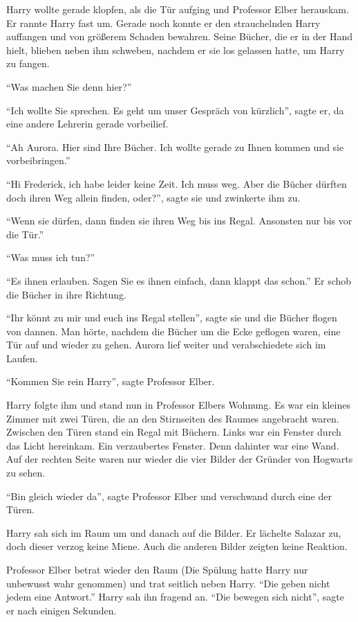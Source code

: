 Harry wollte gerade klopfen, als die Tür aufging und Professor Elber herauskam. Er rannte Harry fast um. Gerade noch konnte er den strauchelnden Harry auffangen und von größerem Schaden bewahren. Seine Bücher, die er in der Hand hielt, blieben neben ihm schweben, nachdem er sie los gelassen hatte, um Harry zu fangen.

\enquote{Was machen Sie denn hier?}

\enquote{Ich wollte Sie sprechen. Es geht um unser Gespräch von kürzlich}, sagte er, da eine andere Lehrerin gerade vorbeilief.

\enquote{Ah Aurora. Hier sind Ihre Bücher. Ich wollte gerade zu Ihnen kommen und sie vorbeibringen.}

\enquote{Hi Frederick, ich habe leider keine Zeit. Ich muss weg. Aber die Bücher dürften doch ihren Weg allein finden, oder?}, sagte sie und zwinkerte ihm zu.

\enquote{Wenn sie dürfen, dann finden sie ihren Weg bis ins Regal. Ansonsten nur bis vor die Tür.}

\enquote{Was muss ich tun?}

\enquote{Es ihnen erlauben. Sagen Sie es ihnen einfach, dann klappt das schon.} Er schob die Bücher in ihre Richtung.

\enquote{Ihr könnt zu mir und euch ins Regal stellen}, sagte sie und die Bücher flogen von dannen. Man hörte, nachdem die Bücher um die Ecke geflogen waren, eine Tür auf und wieder zu gehen. Aurora lief weiter und verabschiedete sich im Laufen.

\enquote{Kommen Sie rein Harry}, sagte Professor Elber.

Harry folgte ihm und stand nun in Professor Elbers Wohnung. Es war ein kleines Zimmer mit zwei Türen, die an den Stirnseiten des Raumes angebracht waren. Zwischen den Türen stand ein Regal mit Büchern. Links war ein Fenster durch das Licht hereinkam. Ein verzaubertes Fenster. Denn dahinter war eine Wand. Auf der rechten Seite waren nur wieder die vier Bilder der Gründer von Hogwarts zu sehen.

\enquote{Bin gleich wieder da}, sagte Professor Elber und verschwand durch eine der Türen.

Harry sah sich im Raum um und danach auf die Bilder. Er lächelte Salazar zu, doch dieser verzog keine Miene. Auch die anderen Bilder zeigten keine Reaktion.

Professor Elber betrat wieder den Raum (Die Spülung hatte Harry nur unbewusst wahr genommen) und trat seitlich neben Harry. \enquote{Die geben nicht jedem eine Antwort.} Harry sah ihn fragend an. \enquote{Die bewegen sich nicht}, sagte er nach einigen Sekunden.

